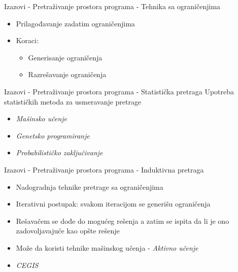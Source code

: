 \begin{frame}{Izazovi - Pretraživanje prostora programa - Tehnika sa ograničenjima}
    \begin{itemize}
        \item Prilagođavanje zadatim ograničenjima
        \item Koraci:
            \begin{itemize}
                \item Generisanje ograničenja
                \item Razrešavanje ograničenja
            \end{itemize}
    \end{itemize}
\end{frame}


\begin{frame}{Izazovi - Pretraživanje prostora programa - Statistička pretraga}
    Upotreba statističkih metoda za usmeravanje pretrage
    \begin{itemize}
        \item \emph{Mašinsko učenje}
        \item \emph{Genetsko programiranje}
        \item \emph{Probabilističko zaključivanje}
    \end{itemize}
\end{frame}


\begin{frame}{Izazovi - Pretraživanje prostora programa - Induktivna pretraga}
    \begin{itemize}
        \item Nadogradnja tehnike pretrage sa ograničenjima
        \item Iterativni postupak: svakom iteracijom se generišu ograničenja
        \item Rešavačem se dođe do mogućeg rešenja a zatim se ispita da li je ono zadovoljavajuće kao opšte rešenje
        \item Može da koristi tehnike mašinskog učenja - \emph{Aktivno učenje}
        \item \emph{CEGIS}
    \end{itemize}
\end{frame}
